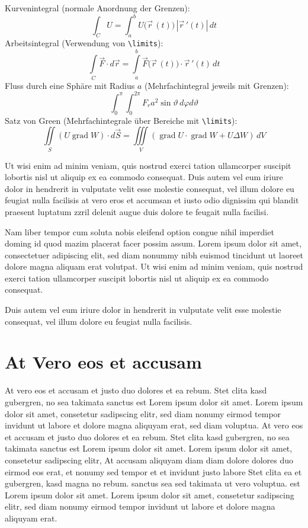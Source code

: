 \documentclass[ %
	DIV=14, %
	BCOR=20mm, %
	parskip=half, %
	headsepline, %
	cleardoublepage=empty, %
	tablecaptionabove, %
	toc=bib, %
	toc=listofnumbered, %
	listof=leveldown, %
	numbers=noendperiod %
	]{scrbook}
\begin{document}
Kurvenintegral (normale Anordnung der Grenzen):
  \[
    \int_C U = \int_a^b U \big(\vec{r}\,(t)\big)\,|\vec{r}\,'(t)|\,dt
  \]
  Arbeitsintegral (Verwendung von \verb|\limits|):
  \[
    \int\limits_C \vec{F} \cdot d\vec{r} 
      =\int\limits_a^b \vec{F} \big(\vec{r}\,(t)\big)
      \cdot \vec{r}\,'(t)\,dt
  \]
  Fluss durch eine Sphäre mit Radius $a$ (Mehrfachintegral jeweils mit Grenzen):
  \[
    \int_0^\pi \int_0^{2\pi} F_r a^2 \sin\vartheta \, d\varphi d\vartheta
  \]
  Satz von Green (Mehrfachintegrale über Bereiche mit \verb|\limits|):
  \[
    \iint\limits_S (U \operatorname{grad} W)\cdot d\vec{S} 
    =\iiint\limits_V (\operatorname{grad} U\cdot 
     \operatorname{grad} W +U\Delta W)\,dV
  \]

Ut wisi enim ad minim veniam, quis nostrud exerci tation ullamcorper suscipit lobortis nisl ut aliquip ex ea commodo consequat. Duis autem vel eum iriure dolor in hendrerit in vulputate velit esse molestie consequat, vel illum dolore eu feugiat nulla facilisis at vero eros et accumsan et iusto odio dignissim qui blandit praesent luptatum zzril delenit augue duis dolore te feugait nulla facilisi. 

Nam liber tempor cum soluta nobis eleifend option congue nihil imperdiet doming id quod mazim placerat facer possim assum. Lorem ipsum dolor sit amet, consectetuer adipiscing elit, sed diam nonummy nibh euismod tincidunt ut laoreet dolore magna aliquam erat volutpat. Ut wisi enim ad minim veniam, quis nostrud exerci tation ullamcorper suscipit lobortis nisl ut aliquip ex ea commodo consequat. 

Duis autem vel eum iriure dolor in hendrerit in vulputate velit esse molestie consequat, vel illum dolore eu feugiat nulla facilisis.


\section{At Vero eos et accusam} %
\label{sec:at_vero_eos_et_accusam}

At vero eos et accusam et justo duo dolores et ea rebum. Stet clita kasd gubergren, no sea takimata sanctus est Lorem ipsum dolor sit amet. Lorem ipsum dolor sit amet, consetetur sadipscing elitr, sed diam nonumy eirmod tempor invidunt ut labore et dolore magna aliquyam erat, sed diam voluptua. At vero eos et accusam et justo duo dolores et ea rebum. Stet clita kasd gubergren, no sea takimata sanctus est Lorem ipsum dolor sit amet. Lorem ipsum dolor sit amet, consetetur sadipscing elitr, At accusam aliquyam diam diam dolore dolores duo eirmod eos erat, et nonumy sed tempor et et invidunt justo labore Stet clita ea et gubergren, kasd magna no rebum. sanctus sea sed takimata ut vero voluptua. est Lorem ipsum dolor sit amet. Lorem ipsum dolor sit amet, consetetur sadipscing elitr, sed diam nonumy eirmod tempor invidunt ut labore et dolore magna aliquyam erat.
\end{document}
